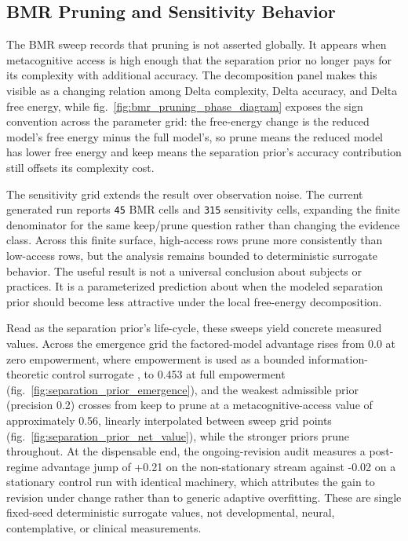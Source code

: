 \documentclass[
]{article}
\begin{document}
\subsection{BMR Pruning and Sensitivity
Behavior}\label{sec:results-bmr-sensitivity}

The BMR sweep records that pruning is not asserted globally. It appears
when metacognitive access is high enough that the separation prior no
longer pays for its complexity with additional accuracy. The
decomposition panel makes this visible as a changing relation among
Delta complexity, Delta accuracy, and Delta free energy, while
fig.~\ref{fig:bmr_pruning_phase_diagram} exposes the sign convention
across the parameter grid: the free-energy change is the reduced model's
free energy minus the full model's, so prune means the reduced model has
lower free energy and keep means the separation prior's accuracy
contribution still offsets its complexity cost.

The sensitivity grid extends the result over observation noise. The
current generated run reports \texttt{45} BMR cells and \texttt{315}
sensitivity cells, expanding the finite denominator for the same
keep/prune question rather than changing the evidence class. Across this
finite surface, high-access rows prune more consistently than low-access
rows, but the analysis remains bounded to deterministic surrogate
behavior. The useful result is not a universal conclusion about subjects
or practices. It is a parameterized prediction about when the modeled
separation prior should become less attractive under the local
free-energy decomposition.

Read as the separation prior's life-cycle, these sweeps yield concrete
measured values. Across the emergence grid the factored-model advantage
rises from 0.0 at zero empowerment, where empowerment is used as a
bounded information-theoretic control surrogate
\citep{klyubin2005empowerment}, to 0.453 at full empowerment
(fig.~\ref{fig:separation_prior_emergence}), and the weakest admissible
prior (precision 0.2) crosses from keep to prune at a
metacognitive-access value of approximately 0.56, linearly interpolated
between sweep grid points (fig.~\ref{fig:separation_prior_net_value}),
while the stronger priors prune throughout. At the dispensable end, the
ongoing-revision audit measures a post-regime advantage jump of +0.21 on
the non-stationary stream against -0.02 on a stationary control run with
identical machinery, which attributes the gain to revision under change
rather than to generic adaptive overfitting. These are single fixed-seed
deterministic surrogate values, not developmental, neural,
contemplative, or clinical measurements.
\end{document}
